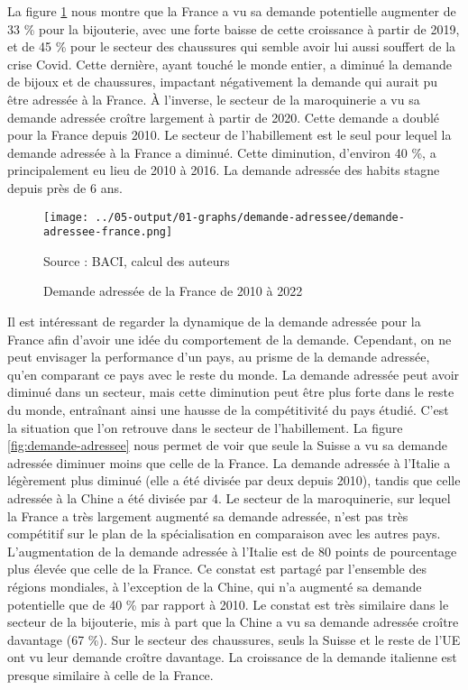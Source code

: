 \documentclass[french,10pt,a4paper]{article}
\begin{document}
La figure \ref{fig:demande-adressee-france} nous montre que la France a vu sa demande potentielle augmenter de 33 \% pour la bijouterie, avec une forte baisse de cette croissance à partir de 2019, et de 45 \% pour le secteur des chaussures qui semble avoir lui aussi souffert de la crise Covid. Cette dernière, ayant touché le monde entier, a diminué la demande de bijoux et de chaussures, impactant négativement la demande qui aurait pu être adressée à la France. À l'inverse, le secteur de la maroquinerie a vu sa demande adressée croître largement à partir de 2020. Cette demande a doublé pour la France depuis 2010. Le secteur de l'habillement est le seul pour lequel la demande adressée à la France a diminué. Cette diminution, d'environ 40 \%, a principalement eu lieu de 2010 à 2016. La demande adressée des habits stagne depuis près de 6 ans.

\begin{figure}[!h]
  \centering  \texttt{[image: ../05-output/01-graphs/demande-adressee/demande-adressee-france.png]}
  \captionsetup{justification=raggedright,singlelinecheck=false, font=small}
  \caption*{Source : BACI, calcul des auteurs}
  \captionsetup{justification=centering, singlelinecheck=true, font=normalsize}
  \caption{Demande adressée de la France de 2010 à 2022}
  \label{fig:demande-adressee-france}
\end{figure}

Il est intéressant de regarder la dynamique de la demande adressée pour la France afin d'avoir une idée du comportement de la demande. Cependant, on ne peut envisager la performance d'un pays, au prisme de la demande adressée, qu'en comparant ce pays avec le reste du monde. La demande adressée peut avoir diminué dans un secteur, mais cette diminution peut être plus forte dans le reste du monde, entraînant ainsi une hausse de la compétitivité du pays étudié. C'est la situation que l'on retrouve dans le secteur de l'habillement. La figure \ref{fig:demande-adressee} nous permet de voir que seule la Suisse a vu sa demande adressée diminuer moins que celle de la France. La demande adressée à l'Italie a légèrement plus diminué (elle a été divisée par deux depuis 2010), tandis que celle adressée à la Chine a été divisée par 4. Le secteur de la maroquinerie, sur lequel la France a très largement augmenté sa demande adressée, n'est pas très compétitif sur le plan de la spécialisation en comparaison avec les autres pays. L'augmentation de la demande adressée à l'Italie est de 80 points de pourcentage plus élevée que celle de la France. Ce constat est partagé par l'ensemble des régions mondiales, à l'exception de la Chine, qui n'a augmenté sa demande potentielle que de 40 \% par rapport à 2010. Le constat est très similaire dans le secteur de la bijouterie, mis à part que la Chine a vu sa demande adressée croître davantage (67 \%). Sur le secteur des chaussures, seuls la Suisse et le reste de l'UE ont vu leur demande croître davantage. La croissance de la demande italienne est presque similaire à celle de la France.
\end{document}
